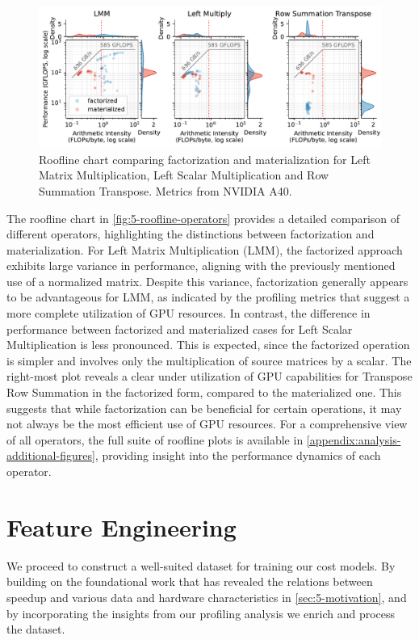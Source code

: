\begin{figure}[ht]
  \centering
  \includegraphics[width=\linewidth]{chapters/05_cost_estimation/figures/roofline-operators.pdf}
  \caption[Roofline chart per operator]{Roofline chart comparing factorization and materialization for Left Matrix Multiplication, Left Scalar Multiplication and Row Summation Transpose. Metrics from NVIDIA A40.}
  \label{fig:5-roofline-operators}
\end{figure}

The roofline chart in \autoref{fig:5-roofline-operators} provides a detailed comparison of different operators, highlighting the distinctions between factorization and materialization. For Left Matrix Multiplication (LMM), the factorized approach exhibits large variance in performance, aligning with the previously mentioned use of a normalized matrix. Despite this variance, factorization generally appears to be advantageous for LMM, as indicated by the profiling metrics that suggest a more complete utilization of GPU resources. In contrast, the difference in performance between factorized and materialized cases for Left Scalar Multiplication is less pronounced. This is expected, since the factorized operation is simpler and involves only the multiplication of source matrices by a scalar. The right-most plot reveals a clear under utilization of GPU capabilities for Transpose Row Summation in the factorized form, compared to the materialized one. This suggests that while factorization can be beneficial for certain operations, it may not always be the most efficient use of GPU resources. For a comprehensive view of all operators, the full suite of roofline plots is available in \autoref{appendix:analysis-additional-figures}, providing insight into the performance dynamics of each operator.

\section{Feature Engineering}
\label{sec:5-feature-engineering}
We proceed to construct a well-suited dataset for training our cost models. By building on the foundational work that has revealed the relations between speedup and various data and hardware characteristics in \autoref{sec:5-motivation}, and by incorporating the insights from our profiling analysis we enrich and process the dataset.

